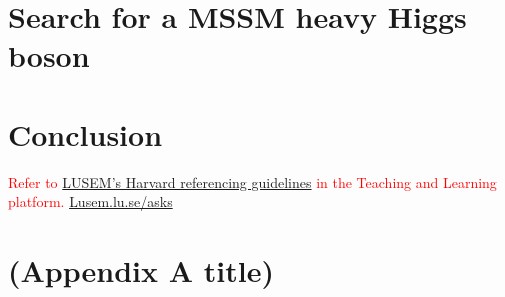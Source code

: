 \documentclass[12pt,twoside]{report}
\newcommand{\mcite}[1]{\textcolor{mycolor}{\citeauthor{#1} (\citeyear{#1})}}
\newcommand{\hcite}[1]{(\textcolor{mycolor}{\citeauthor{#1}, \citeyear{#1}})}
\begin{document}
    \chapter{Search for a MSSM heavy Higgs boson}
    \label{sec:Analysis}
    
    
    \chapter{Conclusion}
    
    
    
    
    \vspace{2.0cm}
    \textcolor{red}{Refer to \href{http://libguides.lub.lu.se/plagiarism}{LUSEM’s Harvard referencing guidelines} in the Teaching and Learning platform. \url{Lusem.lu.se/asks}}

    \appendix
    \chapter{(Appendix A title)}
    
    
%     
\end{document}
